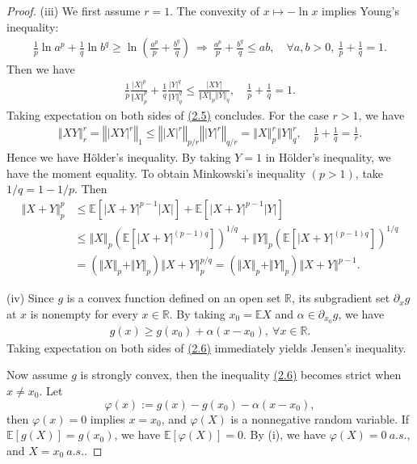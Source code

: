 \documentclass{article}
\numberwithin{equation}{section}
\newcommand{\E}{\mathbb{E}}
\theoremstyle{plain}
\theoremstyle{definition}
\begin{document}
\begin{proof}
(iii) We first assume $r=1$. The convexity of $x\mapsto -\ln x$ implies Young's inequality:
\begin{align*}
	\frac{1}{p}\ln a^p + \frac{1}{q}\ln b^q \geq \ln\left(\frac{a^p}{p}+\frac{b^q}{q}\right)\ \Rightarrow\ \frac{a^p}{p}+\frac{b^q}{q}\leq ab,\quad \forall a,b>0,\ \frac{1}{p}+\frac{1}{q}=1.
\end{align*}
Then we have
\begin{align*}
	\frac{1}{p}\frac{\vert X\vert^p}{\Vert X\Vert_p^p} + \frac{1}{q}\frac{\vert Y\vert^q}{\Vert Y\Vert_q^q}\leq \frac{\vert XY\vert}{\left\Vert X\right\Vert_p\left\Vert Y\right\Vert_q},\quad \frac{1}{p}+\frac{1}{q}=1.\tag{2.5}\label{eq:2.5}
\end{align*}
Taking expectation on both sides of \hyperref[eq:2.5]{(2.5)} concludes. For the case $r>1$, we have
\begin{align*}
	\Vert XY\Vert_r^r = \left\Vert\left\vert XY\right\vert^r\right\Vert_1\leq\left\Vert\left\vert X\right\vert^r\right\Vert_{p/r}\left\Vert\left\vert Y\right\vert^r\right\Vert_{q/r} = \left\Vert X\right\Vert_p^r\left\Vert Y\right\Vert_q^r,\quad \frac{1}{p}+\frac{1}{q}=\frac{1}{r}.
\end{align*}
Hence we have Hölder's inequality. By taking $Y=1$ in Hölder's inequality, we have the moment equality. To obtain Minkowski's inequality $(p>1)$, take $1/q=1-1/p$. Then
\begin{align*}
	\Vert X+Y\Vert_p^p &\leq \E\left[\vert X+Y\vert^{p-1}\vert X\vert\right] + \E\left[\vert X+Y\vert^{p-1}\vert Y\vert\right]\\
	&\leq \left\Vert X\right\Vert_p\left(\E\left[\vert X+Y\vert^{(p-1)q}\right]\right)^{1/q} + \left\Vert Y\right\Vert_p\left(\E\left[\vert X+Y\vert^{(p-1)q}\right]\right)^{1/q} \tag{By Hölder's inequality}\\
	&= \left(\Vert X\Vert_p + \Vert Y\Vert_p\right)\left\Vert X+Y\right\Vert^{p/q}_p = \left(\Vert X\Vert_p + \Vert Y\Vert_p\right)\left\Vert X+Y\right\Vert^{p-1}.
\end{align*}

(iv) Since $g$ is a convex function defined on an open set $\mathbb{R}$, its subgradient set $\partial_x g$ at $x$ is nonempty for every $x\in\mathbb{R}$. By taking $x_0=\E X$ and $\alpha\in\partial_{x_0}g$, we have
\begin{align*}
	g(x) \geq g(x_0) + \alpha(x-x_0),\ \forall x\in\mathbb{R}.\tag{2.6}\label{eq:2.6}
\end{align*}
Taking expectation on both sides of \hyperref[eq:2.6]{(2.6)} immediately yields Jensen's inequality.

Now assume $g$ is strongly convex, then the inequality \hyperref[eq:2.6]{(2.6)} becomes strict when $x\neq x_0$. Let $$\varphi(x):=g(x)-g(x_0)-\alpha(x-x_0),$$ 
then $\varphi(x)=0$ implies $x=x_0$, and $\varphi(X)$ is a nonnegative random variable. If $\E[g(X)]=g(x_0)$, we have $\E[\varphi(X)]=0$. By (i), we have $\varphi(X)=0\ a.s.$, and $X=x_0\ a.s.$.
\end{proof}
\newpage
\end{document}
